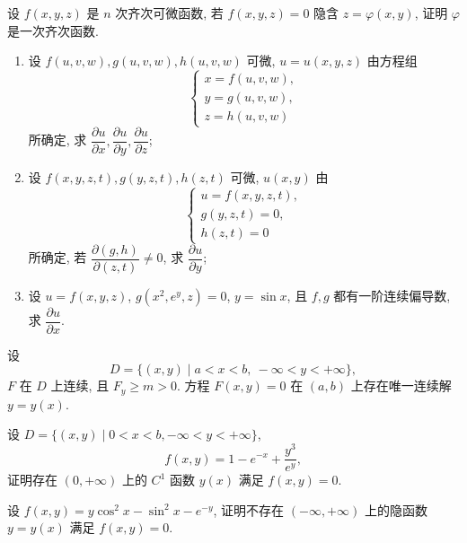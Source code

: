 \documentclass[../数学分析培优讲义.tex]{subfiles}
\begin{document}
\begin{example}
设 $f(x,y,z)$ 是 $n$ 次齐次可微函数, 若 $f(x,y,z)=0$ 隐含 $z=\varphi(x,y)$, 证明 $\varphi$ 是一次齐次函数.
\end{example}
\exampleblank

\begin{example}
\begin{enumerate}[label=(\arabic*)]
    \item 设 $f(u,v,w),g(u,v,w),h(u,v,w)$ 可微, $u=u(x,y,z)$ 由方程组
    \[
        \begin{cases}
            x=f(u,v,w),\\
            y=g(u,v,w),\\
            z=h(u,v,w)
        \end{cases}
    \]
    所确定, 求 $\dfrac{\partial u}{\partial x},\dfrac{\partial u}{\partial y},\dfrac{\partial u}{\partial z}$;
    \item 设 $f(x,y,z,t),g(y,z,t),h(z,t)$ 可微, $u(x,y)$ 由
    \[
        \begin{cases}
            u=f(x,y,z,t),\\
            g(y,z,t)=0,\\
            h(z,t)=0
        \end{cases}
    \]
    所确定, 若 $\dfrac{\partial(g,h)}{\partial(z,t)}\ne0$, 求 $\dfrac{\partial u}{\partial y}$;
    \item 设 $u=f(x,y,z)$, $g(x^2,e^y,z)=0$, $y=\sin x$, 且 $f,g$ 都有一阶连续偏导数, 求 $\dfrac{\partial u}{\partial x}$.
\end{enumerate}
\end{example}
\exampleblank


\newpage


\begin{proposition}
设
\[
    D=\{(x,y)\mid a<x<b,\ -\infty<y<+\infty\},
\]
$F$ 在 $D$ 上连续, 且 $F_y\geq m>0$. 方程 $F(x,y)=0$ 在 $(a,b)$ 上存在唯一连续解 $y=y(x)$.
\end{proposition}

\begin{example}
设 $D=\{(x,y)\mid0<x<b,-\infty<y<+\infty\}$,
\[
    f(x,y)=1-e^{-x}+\dfrac{y^3}{e^y},
\]
证明存在 $(0,+\infty)$ 上的 $C^1$ 函数 $y(x)$ 满足 $f(x,y)=0$.
\end{example}
\exampleblank

\begin{example}
设 $f(x,y)=y\cos^2x-\sin^2x-e^{-y}$, 证明不存在 $(-\infty,+\infty)$ 上的隐函数 $y=y(x)$ 满足 $f(x,y)=0$.
\end{example}
\exampleblank
\end{document}
